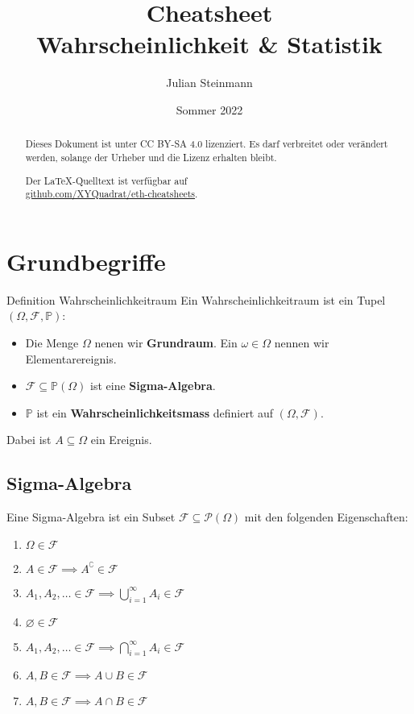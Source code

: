 \documentclass[a4paper,10pt]{article}
\title{Cheatsheet\\ Wahrscheinlichkeit \& Statistik}
\author{Julian Steinmann}
\date{Sommer 2022}
\def\P{\mathbb{P}}
\def\F{\mathcal{F}}
\begin{document}
\maketitle

\renewcommand{\abstractname}{Lizenz}
\begin{abstract}
    Dieses Dokument ist unter CC BY-SA 4.0 lizenziert. Es darf verbreitet oder verändert werden, solange der Urheber und die Lizenz erhalten bleibt.

    \begin{center}
        Der \LaTeX-Quelltext ist verfügbar auf \\ \href{https://github.com/XYQuadrat/eth-cheatsheets}{github.com/XYQuadrat/eth-cheatsheets}.
    \end{center}
\end{abstract}

\section{Grundbegriffe}
\begin{subbox}{Definition Wahrscheinlichkeitraum}
    Ein Wahrscheinlichkeitraum ist ein Tupel \((\Omega, \F, \P)\):
    \begin{itemize}
        \item Die Menge \(\Omega\) nenen wir \textbf{Grundraum}. Ein \(\omega \in \Omega\) nennen wir Elementarereignis.
        \item \(\F \subseteq \P(\Omega)\) ist eine \textbf{Sigma-Algebra}.
        \item \(\P\) ist ein \textbf{Wahrscheinlichkeitsmass} definiert auf \((\Omega, \F)\).
    \end{itemize}
    Dabei ist \(A \subseteq \Omega\) ein Ereignis.
\end{subbox}

\subsection{Sigma-Algebra}
Eine Sigma-Algebra ist ein Subset \(\F \subseteq \mathcal{P}(\Omega)\) mit den folgenden Eigenschaften:
\begin{enumerate}
    \item \(\Omega \in \F\)
    \item \(A \in \F \implies A^\complement \in \F\)
    \item \(A_1, A_2, \ldots \in \F \implies \bigcup_{i=1}^\infty A_i \in \F\)
    \item \(\varnothing \in \F\)
    \item \(A_1, A_2, \ldots \in \F \implies \bigcap_{i=1}^\infty A_i \in \F\)
    \item \(A, B \in \F \implies A \cup B \in \F\)
    \item \(A, B \in \F \implies A \cap B \in \F\)
\end{enumerate}
\end{document}

